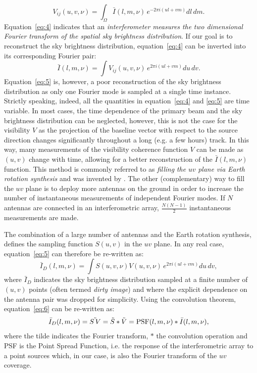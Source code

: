 \begin{equation}
V_{ij} (u,v, \nu) = \int_\Omega {\bar I} (l, m, \nu) \, e^{-2 \pi i (ul + vm)} dl \, dm.
\label{eq:4}
\end{equation}
Equation~\ref{eq:4} indicates that an {\it interferometer measures the two dimensional Fourier transform of the spatial sky brightness distribution}. If our goal is to reconstruct the sky brightness distribution, equation~\ref{eq:4} can be inverted into its corresponding Fourier pair:
\begin{equation}
{\bar I} (l, m, \nu) = \int V_{ij} (u,v, \nu) \, e^{2 \pi i (ul + vm)} du \, dv.
\label{eq:5}
\end{equation}
Equation~\ref{eq:5} is, however, a poor reconstruction of the sky brightness distribution as only one Fourier mode is sampled at a single time instance. Strictly speaking, indeed, all the quantities in equation~\ref{eq:4} and \ref{eq:5} are time variable. In most cases, the time dependence of the primary beam and the sky brightness distribution can be neglected, however, this is not the case for the visibility $V$ as the projection of the baseline vector with respect to the source direction changes significantly throughout a long (e.g. a few hours) track. In this way, many measurements of the visibility coherence function $V$ can be made as $(u,v)$ change with time, allowing for a better reconstruction of the ${\bar I} (l, m, \nu)$ function. This method is commonly referred to as {\it filling the $uv$ plane via Earth rotation synthesis} and was invented by \cite{ryle60}. The other (complementary) way to fill the $uv$ plane is to deploy more antennas on the ground in order to increase the number of instantaneous measurements of independent Fourier modes. If $N$ antennas are connected in an interferometric array, $\frac{N (N - 1)}{2}$ instantaneous measurements are made. 

The combination of a large number of antennas and the Earth rotation synthesis, defines the sampling function $S(u,v)$ in the $uv$ plane. In any real case, equation~\ref{eq:5} can therefore be re-written as:
\begin{equation}
{\bar I}_D (l, m, \nu) = \int S(u,v, \nu) V (u,v, \nu) \, e^{2 \pi i (ul + vm)} du \, dv,
\label{eq:6}
\end{equation}
where ${\bar I}_D$ indicates the sky brightness distribution sampled at a finite number of $(u,v)$ points (often termed {\it dirty image}) and where the explicit dependence on the antenna pair was dropped for simplicity. Using the convolution theorem, equation~\ref{eq:6} can be re-written as:
\begin{equation}
{\bar I}_D (l, m, \nu)  =  \tilde{S \, V} =  {\tilde S} \ast {\tilde V} = {\rm PSF} (l, m, \nu) \ast {\bar I} (l, m, \nu),
\label{eq:7}
\end{equation}
where the tilde indicates the Fourier transform, $\ast$ the convolution operation and PSF is the Point Spread Function, i.e. the response of the interferometric array to a point sources which, in our case, is also the Fourier transform of the $uv$ coverage.

